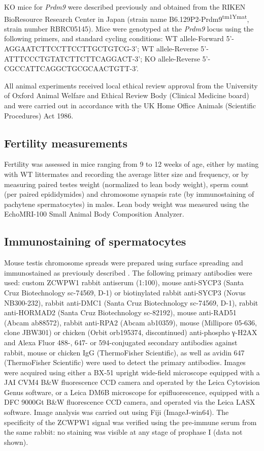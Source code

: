 KO mice for \textit{Prdm9} were described previously \parencite{Hayashi2005histone} and obtained from the RIKEN BioResource Research Center in Japan (strain name B6.129P2-Prdm9\textsuperscript{tm1Ymat}, strain number RBRC05145).
Mice were genotyped at the \textit{Prdm9} locus using the following primers, and standard cycling conditions: WT allele-Forward 5’-AGGAATCTTCCTTCCTTGCTGTCG-3’; WT allele-Reverse 5’-ATTTCCCTGTATCTTCTTCAGGACT-3’; KO allele-Reverse 5’-CGCCATTCAGGCTGCGCAACTGTT-3’.

All animal experiments received local ethical review approval from the University of Oxford Animal Welfare and Ethical Review Body (Clinical Medicine board) and were carried out in accordance with the UK Home Office Animals (Scientific Procedures) Act 1986.

\subsection{Fertility measurements}
\label{sec:fertility}
Fertility was assessed in mice ranging from 9 to 12 weeks of age, either by mating with WT littermates and recording the average litter size and frequency, or by measuring paired testes weight (normalized to lean body weight), sperm count (per paired epididymides) and chromosome synapsis rate (by immunostaining of pachytene spermatocytes) in males.
Lean body weight was measured using the EchoMRI-100 Small Animal Body Composition Analyzer.

\subsection{Immunostaining of spermatocytes}
\label{sec:immunostaining}
Mouse testis chromosome spreads were prepared using surface spreading \parencite{Barchi2008ATM, Peters1997dryingdown} and immunostained as previously described \parencite{Davies2016Reengineering}.
The following primary antibodies were used: custom ZCWPW1 rabbit antiserum (1:100), mouse anti-SYCP3 (Santa Cruz Biotechnology sc-74569, D-1) or biotinylated rabbit anti-SYCP3 (Novus NB300-232), rabbit anti-DMC1 (Santa Cruz Biotechnology sc-74569, D-1), rabbit anti-HORMAD2 (Santa Cruz Biotechnology sc-82192), mouse anti-RAD51 (Abcam ab88572), rabbit anti-RPA2 (Abcam ab10359), mouse (Millipore 05-636, clone JBW301) or chicken (Orbit orb195374, discontinued) anti-phospho γ-H2AX and Alexa Fluor 488-, 647- or 594-conjugated secondary antibodies against rabbit, mouse or chicken IgG (ThermoFisher Scientific), as well as avidin 647 (ThermoFisher Scientific) were used to detect the primary antibodies.
Images were acquired using either a BX-51 upright wide-field microscope equipped with a JAI CVM4 B\&W fluorescence CCD camera and operated by the Leica Cytovision Genus software, or a Leica DM6B microscope for epifluorescence, equipped with a DFC 9000Gt B\&W fluorescence CCD camera, and operated via the Leica LASX software.
Image analysis was carried out using Fiji (ImageJ-win64).
The specificity of the ZCWPW1 signal was verified using the pre-immune serum from the same rabbit: no staining was visible at any stage of prophase I (data not shown).

